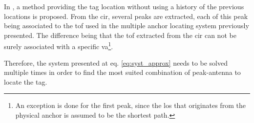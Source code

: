 In \cite{jespersen2018indoor}, a method providing the tag location without using a history of the previous locations is proposed. From the \gls{cir}, several peaks are extracted, each of this peak being associated to the \gls{tof} used in the multiple anchor locating system previously presented. The difference being that the \gls{tof} extracted from the \gls{cir} can not be surely associated with a specific \gls{va}\footnote{An exception is done for the first peak, since the \gls{los} that originates from the physical anchor is assumed to be the shortest path.}. 
\vspace{2mm}

Therefore, the system presented at eq. \ref{eq:syst_approx} needs to be solved multiple times in order to find the most suited combination of peak-antenna to locate the tag.
